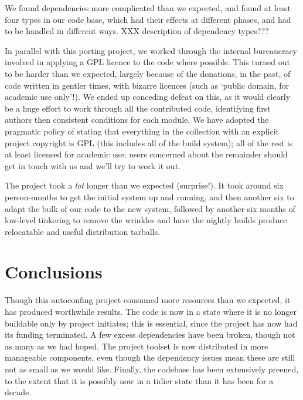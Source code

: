 \documentclass{speauth}
\begin{document}
We found dependencies more complicated than we expected, and found at
least four types in our code base, which had their effects at
different phases, and had to be handled in different ways.  XXX
description of dependency types???

In parallel with this porting project, we worked through the internal
bureaucracy involved in applying a GPL licence to the code where
possible.  This turned out to be harder than we expected, largely
because of the donations, in the past, of code written in gentler
times, with bizarre licences (such as `public domain, for academic use
only'!).  We ended up conceding defeat on this, as it would clearly be
a huge effort to work through all the contributed code, identifying
first authors then consistent conditions for each module.  We have
adopted the pragmatic policy of stating that everything in the
collection with an explicit project copyright is GPL (this includes
all of the build system); all of the rest is at least licensed for
academic use; users concerned about the remainder should get in touch
with us and we'll try to work it out.

The project took a \emph{lot} longer than we expected (surprise!).  It
took around six person-months to get the initial system up and
running, and then another six to adapt the bulk of our code to the new
system, followed by another six months of low-level tinkering to
remove the wrinkles and have the nightly builds produce relocatable
and useful distribution tarballs.

\section{Conclusions}

Though this autoconfing project consumed more resources than we
expected, it has produced worthwhile results.  The code is now in a
state where it is no longer buildable only by project initiates; this
is essential, since the project has now had its funding terminated.  A
few excess dependencies have been broken, though not as many as we had hoped.
The project toolset is now distributed in more manageable components,
even though the dependency issues mean these are still not as small as
we would like.  Finally, the codebase has been extensively preened, to the
extent that it is possibly now in a tidier state than it has been for
a decade.




\end{document}
